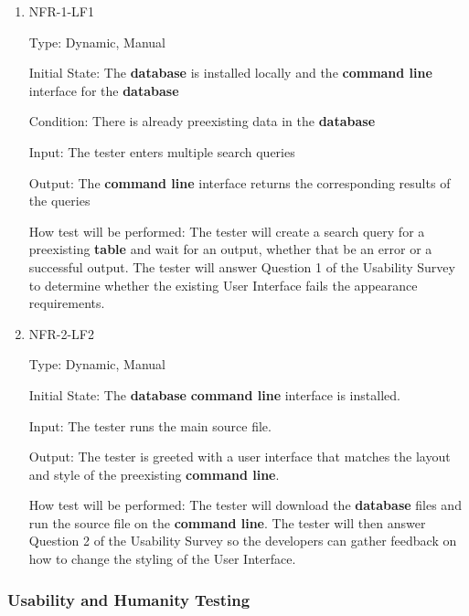 \documentclass[12pt, titlepage]{article}
\begin{document}
\begin{enumerate}

    \item{NFR-1-LF1\\}
    
    Type: Dynamic, Manual
    					
    Initial State: The \textbf{database} is installed locally and the \textbf{command line} interface for the \textbf{database}
    					
    Condition: There is already preexisting data in the \textbf{database}
    
    Input: The tester enters multiple search queries
    					
    Output: The \textbf{command line} interface returns the corresponding results of the queries
    					
    How test will be performed: The tester will create a search query for a preexisting \textbf{table} and wait for an output, whether that be an error or a successful output. The tester will answer Question 1 of the Usability Survey to determine whether the existing User Interface fails the appearance requirements. 
        
    \item{NFR-2-LF2\\}
    
    Type: Dynamic, Manual
    					
    Initial State: The \textbf{database} \textbf{command line} interface is installed. 
    					
    Input: The tester runs the main source file. 
    					
    Output: The tester is greeted with a user interface that matches the layout and style of the preexisting \textbf{command line}.
    					
    How test will be performed: The tester will download the \textbf{database} files and run the source file on the \textbf{command line}. The tester will then answer Question 2 of the Usability Survey so the developers can gather feedback on how to change the styling of the User Interface. 

\end{enumerate}

\subsubsection{Usability and Humanity Testing}
\end{document}
